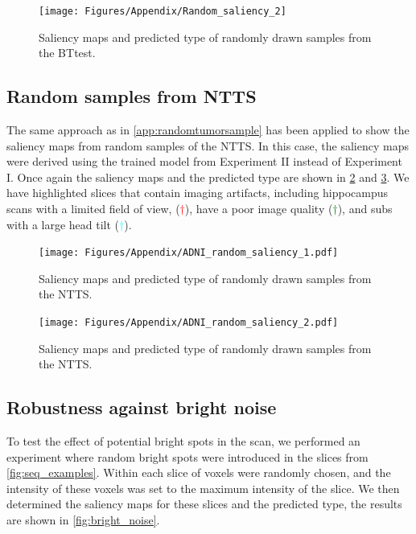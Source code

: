 \begin{subappendices}
\begin{figure}[ht]
    \centering
    \texttt{[image: Figures/Appendix/Random\_saliency\_2]}

    \caption{Saliency maps and predicted \gls{type} of randomly drawn \glspl{sample} from the \gls{BTtest}.}
    \label{fig:random_2}
\end{figure}


\clearpage

\subsection{Random samples from \gls{NTTS}}
The same approach as in \cref{app:randomtumorsample} has been applied to show the saliency maps from random samples of the \gls{NTTS}.
In this case, the saliency maps were derived using the trained model from Experiment II instead of Experiment I.
Once again the saliency maps and the predicted \gls{type} are shown in \cref{fig:random_adni_1} and \cref{fig:random_adni_2}.
We have highlighted \glspl{slice} that contain imaging artifacts, including hippocampus \glspl{scan} with a limited field of view, (\textcolor{red}{$\dagger$}), have a poor image quality (\textcolor{green}{$\dagger$}), and \glspl{sub} with a large head tilt (\textcolor{cyan}{$\dagger$}).


\begin{figure}[ht]
    \centering
    \texttt{[image: Figures/Appendix/ADNI\_random\_saliency\_1.pdf]}

    \caption{Saliency maps and predicted \gls{type} of randomly drawn \glspl{sample} from the \gls{NTTS}.}
    \label{fig:random_adni_1}
\end{figure}

\begin{figure}[ht]
    \centering
    \texttt{[image: Figures/Appendix/ADNI\_random\_saliency\_2.pdf]}

    \caption{Saliency maps and predicted \gls{type} of randomly drawn \glspl{sample} from the \gls{NTTS}.}
    \label{fig:random_adni_2}
\end{figure}


\clearpage


\subsection{Robustness against bright noise}

To test the effect of potential bright spots in the \gls{scan}, we performed an experiment where random bright spots were introduced in the \glspl{slice} from \cref{fig:seq_examples}.
Within each \gls{slice}  of voxels were randomly chosen, and the intensity of these voxels was set to the maximum intensity of the \gls{slice}.
We then determined the saliency maps for these slices and the predicted \gls{type}, the results are shown in \cref{fig:bright_noise}.



\end{subappendices}
